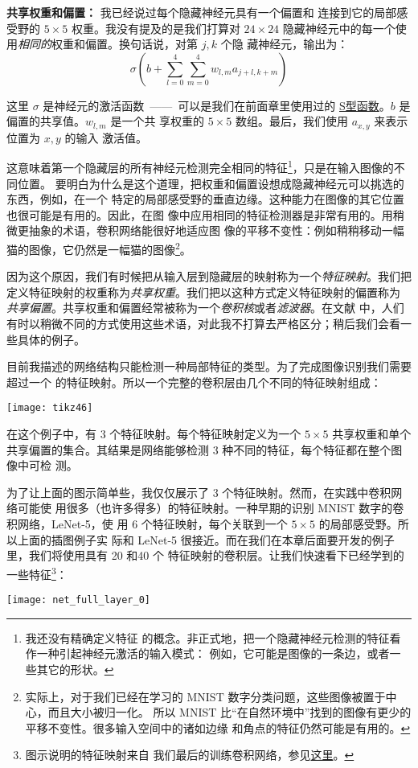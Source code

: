 \textbf{共享权重和偏置：} 我已经说过每个隐藏神经元具有一个偏置和
连接到它的局部感受野的 $5 \times 5$ 权重。我没有提及的是我们打算对 $24 \times
24$ 隐藏神经元中的每一个使用\emph{相同的}权重和偏置。换句话说，对第 $j, k$ 个隐
藏神经元，输出为：
\begin{equation}
  \sigma\left(b + \sum_{l=0}^4 \sum_{m=0}^4  w_{l,m} a_{j+l, k+m} \right)
  \label{eq:125}\tag{125}
\end{equation}

这里 $\sigma$ 是神经元的激活函数~——~可以是我们在前面章里使用过的
\hyperref[sec:sigmoid_neurons]{S型函数}。$b$ 是偏置的共享值。$w_{l,m}$ 是一个共
享权重的 $5 \times 5$ 数组。最后，我们使用 $a_{x, y}$ 来表示位置为 $x, y$ 的输入
激活值。

这意味着第一个隐藏层的所有神经元检测完全相同的特征\footnote{我还没有精确定义特征
  的概念。非正式地，把一个隐藏神经元检测的特征看作一种引起神经元激活的输入模式：
  例如，它可能是图像的一条边，或者一些其它的形状。}，只是在输入图像的不同位置。
要明白为什么是这个道理，把权重和偏置设想成隐藏神经元可以挑选的东西，例如，在一个
特定的局部感受野的垂直边缘。这种能力在图像的其它位置也很可能是有用的。因此，在图
像中应用相同的特征检测器是非常有用的。用稍微更抽象的术语，卷积网络能很好地适应图
像的平移不变性：例如稍稍移动一幅猫的图像，它仍然是一幅猫的图像\footnote{
实际上，对于我们已经在学习的 MNIST 数字分类问题，这些图像被置于中心，而且大小被归一化。
所以 MNIST 比“在自然环境中”找到的图像有更少的平移不变性。很多输入空间中的诸如边缘
和角点的特征仍然可能是有用的。}。

因为这个原因，我们有时候把从输入层到隐藏层的映射称为一个\emph{特征映射}。我们把
定义特征映射的权重称为\emph{共享权重}。我们把以这种方式定义特征映射的偏置称为%
\emph{共享偏置}。共享权重和偏置经常被称为一个\emph{卷积核}或者\emph{滤波器}。在文献
中，人们有时以稍微不同的方式使用这些术语，对此我不打算去严格区分；稍后我们会看一
些具体的例子。

目前我描述的网络结构只能检测一种局部特征的类型。为了完成图像识别我们需要超过一个
的特征映射。所以一个完整的卷积层由几个不同的特征映射组成：
\begin{center}
  \texttt{[image: tikz46]}
\end{center}

在这个例子中，有 3 个特征映射。每个特征映射定义为一个 $5 \times 5$ 共享权重和单个
共享偏置的集合。其结果是网络能够检测 3 种不同的特征，每个特征都在整个图像中可检
测。

为了让上面的图示简单些，我仅仅展示了 $3$ 个特征映射。然而，在实践中卷积网络可能使
用很多（也许多得多）的特征映射。一种早期的识别 MNIST 数字的卷积网络，LeNet-5，使
用 $6$ 个特征映射，每个关联到一个 $5 \times 5$ 的局部感受野。所以上面的插图例子实
际和 LeNet-5 很接近。而在我们在本章后面要开发的例子里，我们将使用具有 20 和40 个
特征映射的卷积层。让我们快速看下已经学到的一些特征\footnote{图示说明的特征映射来自
我们最后的训练卷积网络，参见\hyperref[final_conv]{这里}。}：
\begin{center}
  \texttt{[image: net\_full\_layer\_0]}
\end{center}

